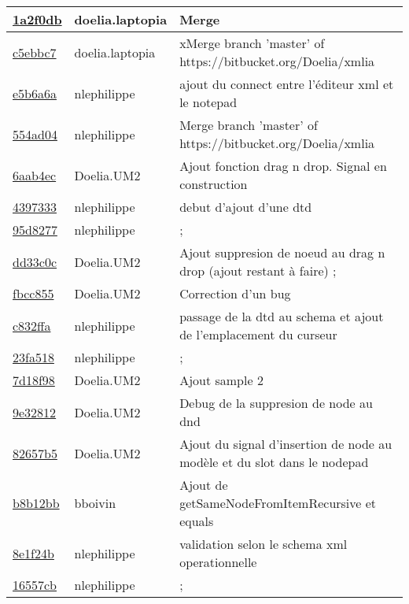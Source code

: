 \begin{tabular}{l l l}
\href{1a2f0db1272d6c39ab5343433c29c289af7f86ed}{1a2f0db} & doelia.laptopia & Merge\\\hline
\href{c5ebbc72b1979017d1510c348bca0be168490378}{c5ebbc7} & doelia.laptopia & xMerge branch 'master' of https://bitbucket.org/Doelia/xmlia\\\hline
\href{e5b6a6a3f1de579ded1ec906614fccf91af0512d}{e5b6a6a} & nlephilippe & ajout du connect entre l'éditeur xml et le notepad\\\hline
\href{554ad04a76a3c6ba4ca24b64f654654def06bf96}{554ad04} & nlephilippe & Merge branch 'master' of https://bitbucket.org/Doelia/xmlia\\\hline
\href{6aab4ec2f4b730dcd0545c2f67a0915e5ec3292a}{6aab4ec} & Doelia.UM2 & Ajout fonction drag n drop. Signal en construction\\\hline
\href{43973334e214221ee941cae9efc7fd5fd1362d6f}{4397333} & nlephilippe & debut d'ajout d'une dtd\\\hline
\href{95d8277384c61558f72e201d89392119aebcd54a}{95d8277} & nlephilippe & ;\\\hline
\href{dd33c0cb4d1171b8d1fd038a1f8a1abd0c334677}{dd33c0c} & Doelia.UM2 & Ajout suppresion de noeud au drag n drop (ajout restant à faire) ;\\\hline
\href{fbcc85520514459fb27ca3fe0748c0f26318536c}{fbcc855} & Doelia.UM2 & Correction d'un bug\\\hline
\href{c832ffaa00c1e54c3f8f478a39fccfd3f0f3f620}{c832ffa} & nlephilippe & passage de la dtd au schema et ajout de l'emplacement du curseur\\\hline
\href{23fa51812c7b5e4753c471aad226e431ace615e5}{23fa518} & nlephilippe & ;\\\hline
\href{7d18f988ca5c0fccc21ae684686bd3f6a9901d18}{7d18f98} & Doelia.UM2 & Ajout sample 2\\\hline
\href{9e32812b4b35705e447d56655f0cb745a2683eb3}{9e32812} & Doelia.UM2 & Debug de la suppresion de node au dnd\\\hline
\href{82657b54433b74814a3eff79a2126b8bf8d62a81}{82657b5} & Doelia.UM2 & Ajout du signal d'insertion de node au modèle et du slot dans le nodepad\\\hline
\href{b8b12bbd20d2272c5f055a26269053c6ea2210a2}{b8b12bb} & bboivin & Ajout de getSameNodeFromItemRecursive et equals\\\hline
\href{8e1f24bbfe3f50962c351c8097bf8766dd15c031}{8e1f24b} & nlephilippe & validation selon le schema xml operationnelle\\\hline
\href{16557cb547eb48f29d810485e5795aa32959cfd2}{16557cb} & nlephilippe & ;\\\hline

\end{tabular}

